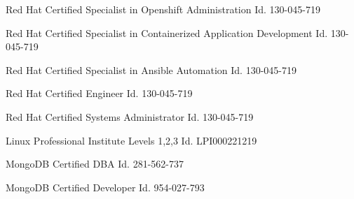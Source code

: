 \begin{cvskills}
  \cvskill
    {Red Hat Certified Specialist in Openshift Administration} %
    {Id. 130-045-719} %

  \cvskill
    {Red Hat Certified Specialist in Containerized Application Development} %
    {Id. 130-045-719} %

  \cvskill
    {Red Hat Certified Specialist in Ansible Automation} %
    {Id. 130-045-719} %

  \cvskill
    {Red Hat Certified Engineer} %
    {Id. 130-045-719} %

  \cvskill
    {Red Hat Certified Systems Administrator} %
    {Id. 130-045-719} %

  \cvskill
    {Linux Professional Institute Levels 1,2,3} %
    {Id. LPI000221219} %

  \cvskill
    {MongoDB Certified DBA} %
    {Id. 281-562-737} %

  \cvskill
    {MongoDB Certified Developer} %
    {Id. 954-027-793} %

\end{cvskills}
